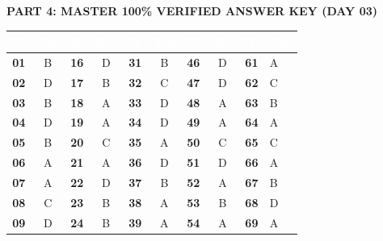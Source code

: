 \documentclass[11pt,a4paper]{article}
\begin{document}
\begin{tcolorbox}[sectionbanner]
  {\large \textbf{\textsf{PART 4: MASTER 100\% VERIFIED ANSWER KEY (DAY 03)}}}
\end{tcolorbox}
\vspace{4pt}

\begin{center}
\renewcommand{\arraystretch}{1.25}
\small
\begin{tabularx}{\textwidth}{|>{\centering\arraybackslash}c|>{\centering\arraybackslash}c|>{\centering\arraybackslash}c|>{\centering\arraybackslash}c|>{\centering\arraybackslash}c|>{\centering\arraybackslash}c|>{\centering\arraybackslash}c|>{\centering\arraybackslash}c|>{\centering\arraybackslash}c|>{\centering\arraybackslash}X|}
\hline
\rowcolor{tableDarkHeader}
\textcolor{white}{\textbf{Q.}} & \textcolor{white}{\textbf{Ans}} & \textcolor{white}{\textbf{Q.}} & \textcolor{white}{\textbf{Ans}} & \textcolor{white}{\textbf{Q.}} & \textcolor{white}{\textbf{Ans}} & \textcolor{white}{\textbf{Q.}} & \textcolor{white}{\textbf{Ans}} & \textcolor{white}{\textbf{Q.}} & \textcolor{white}{\textbf{Ans}} \\
\hline
\rowcolor{white}
\textbf{01} & B & \textbf{16} & D & \textbf{31} & B & \textbf{46} & D & \textbf{61} & A \\
\hline
\rowcolor{tableStripe}
\textbf{02} & D & \textbf{17} & B & \textbf{32} & C & \textbf{47} & D & \textbf{62} & C \\
\hline
\rowcolor{white}
\textbf{03} & B & \textbf{18} & A & \textbf{33} & D & \textbf{48} & A & \textbf{63} & B \\
\hline
\rowcolor{tableStripe}
\textbf{04} & D & \textbf{19} & A & \textbf{34} & D & \textbf{49} & A & \textbf{64} & A \\
\hline
\rowcolor{white}
\textbf{05} & B & \textbf{20} & C & \textbf{35} & A & \textbf{50} & C & \textbf{65} & C \\
\hline
\rowcolor{tableStripe}
\textbf{06} & A & \textbf{21} & A & \textbf{36} & D & \textbf{51} & D & \textbf{66} & A \\
\hline
\rowcolor{white}
\textbf{07} & A & \textbf{22} & D & \textbf{37} & B & \textbf{52} & A & \textbf{67} & B \\
\hline
\rowcolor{tableStripe}
\textbf{08} & C & \textbf{23} & B & \textbf{38} & A & \textbf{53} & B & \textbf{68} & D \\
\hline
\rowcolor{white}
\textbf{09} & D & \textbf{24} & B & \textbf{39} & A & \textbf{54} & A & \textbf{69} & A \\

\end{tabularx}
\end{center}
\end{document}
